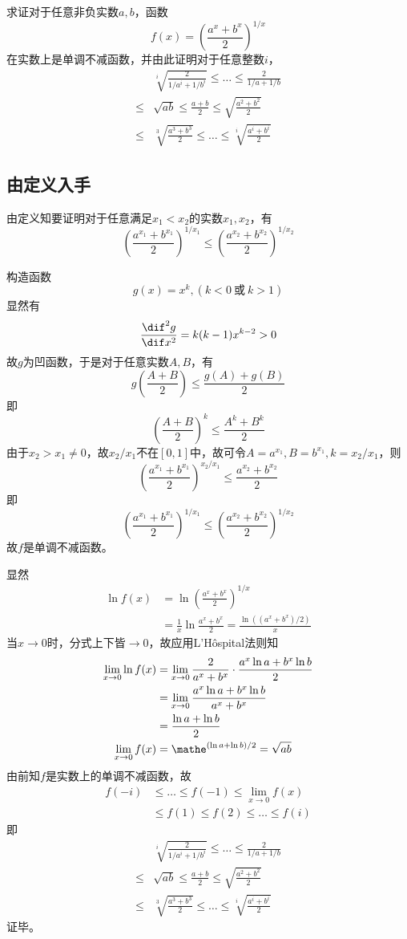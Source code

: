 

求证对于任意非负实数$a, b$，函数
\[ f(x) = \left(\frac{a^x + b^x}2\right)^{1/x} \]
在实数上是单调不减函数，并由此证明对于任意整数$i$，
\begin{align*}
  & \sqrt[i]{\frac2{1/a^i + 1/b^i}} \le \dots \le \frac2{1/a + 1/b} \\
  \le{}& \sqrt{ab} \le \frac{a + b}2 \le \sqrt{\frac{a^2 + b^2}2} \\
  \le{}& \sqrt[3]{\frac{a^3 + b^3}2} \le \dots \le \sqrt[i]{\frac{a^i + b^i}2}
\end{align*}

\subsection{由定义入手} \label{subsec:00B7-def}

由定义知要证明对于任意满足$x_1 < x_2$的实数$x_1, x_2$，有
\[ \left(\frac{a^{x_1} + b^{x_1}}2\right)^{1/x_1} \le \left(\frac{a^{x_2} + b^{x_2}}2\right)^{1/x_2} \]

构造函数
\[ g(x) = x^k, (k < 0\ \text{或}\ k > 1) \]
显然有
\[ \frac{\dif^2 g}{\dif x^2} = k(k - 1)x^{k - 2} > 0 \]
故$g$为凹函数，于是对于任意实数$A, B$，有
\[ g\left(\frac{A + B}2\right) \le \frac{g(A) + g(B)}2 \]
即
\[ \left(\frac{A + B}2\right)^k \le \frac{A^k + B^k}2 \]
由于$x_2 > x_1 \ne 0$，故$x_2/x_1$不在$[0, 1]$中，故可令$A = a^{x_1}, B = b^{x_1}, k = x_2/x_1$，则
\[ \left(\frac{a^{x_1} + b^{x_1}}2\right)^{x_2/x_1} \le \frac{a^{x_2} + b^{x_2}}2 \]
即
\[ \left(\frac{a^{x_1} + b^{x_1}}2\right)^{1/x_1} \le \left(\frac{a^{x_2} + b^{x_2}}2\right)^{1/x_2} \]
故$f$是单调不减函数。

显然
\begin{align*}
  \ln f(x) &= \ln\left(\frac{a^x + b^x}2\right)^{1/x} \\
  &= \frac1x\ln\frac{a^x + b^x}2 = \frac{\ln((a^x + b^x)/2)}x
\end{align*}
当$x \to 0$时，分式上下皆$\to 0$，故应用L'Hôspital法则知
\begin{align*}
  \lim_{x \to 0}\ln f(x) &= \lim_{x \to 0}\frac2{a^x + b^x}\cdot\frac{a^x\ln a + b^x\ln b}2 \\
  &= \lim_{x \to 0}\frac{a^x\ln a + b^x\ln b}{a^x + b^x} \\
  &= \frac{\ln a + \ln b}2 \\
  \lim_{x \to 0}f(x) &= \mathe^{(\ln a + \ln b)/2} = \sqrt{ab}
\end{align*}
由前知$f$是实数上的单调不减函数，故
\begin{align*}
  f(-i) &\le \dots \le f(-1) \le \lim_{x \to 0}f(x) \\
  &\le f(1) \le f(2) \le \dots \le f(i)
\end{align*}
即
\begin{align*}
  & \sqrt[i]{\frac2{1/a^i + 1/b^i}} \le \dots \le \frac2{1/a + 1/b} \\
  \le{}& \sqrt{ab} \le \frac{a + b}2 \le \sqrt{\frac{a^2 + b^2}2} \\
  \le{}& \sqrt[3]{\frac{a^3 + b^3}2} \le \dots \le \sqrt[i]{\frac{a^i + b^i}2}
\end{align*}
证毕。

